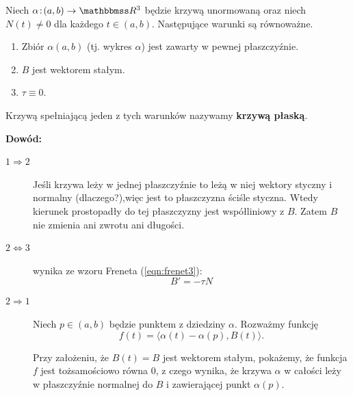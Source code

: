 \begin{frame}[<+->]

\begin{lemat}
Niech $\alpha\colon (a,b)\to \R^3$ będzie krzywą unormowaną oraz niech $N(t)\neq 0$ dla każdego $t\in (a,b)$. Następujące warunki są równoważne.
\begin{enumerate}
\item Zbi\'or $\alpha(a,b)$ (tj. wykres $\alpha$) jest zawarty w pewnej płaszczyźnie.
\item $B$ jest wektorem stałym.
\item $\tau\equiv 0$.
\end{enumerate}

\end{lemat}

\begin{uwaga}
Krzywą spełniającą jeden z tych warunków nazywamy \textbf{krzywą płaską}.
\end{uwaga}

\end{frame}
\begin{frame}

\textcolor{ared}{\textbf{Dowód:}}\pause \\
\begin{description}
\item [$1\Rightarrow 2$] Jeśli krzywa leży w jednej płaszczyźnie to leżą w niej wektory styczny i normalny (dlaczego?),\pause więc jest to płaszczyzna ściśle styczna. \pause Wtedy kierunek prostopadły do tej płaszczyzny jest współliniowy z $B$. Zatem $B$ nie zmienia ani zwrotu ani długości.\pause
\item [$2\Leftrightarrow 3$] wynika ze wzoru Freneta (\ref{eqn:frenet3}):
\[B'=-\tau N\]
\end{description}

\end{frame}
\begin{frame}[<+->]
\begin{description}
\item [$2\Rightarrow 1$] Niech $p\in (a,b)$ będzie punktem z dziedziny $\alpha$. 
Rozważmy funkcję
\[f(t)=\langle \alpha(t)-\alpha(p),B(t)\rangle.\]


Przy założeniu, że $B(t)=B$ jest wektorem stałym, pokażemy, że funkcja $f$ jest tożsamościowo równa $0$, \pause z czego wynika, że krzywa $\alpha$ w całości leży w płaszczyźnie normalnej do $B$ i zawierającej punkt $\alpha(p)$.
\end{description}
\end{frame}
